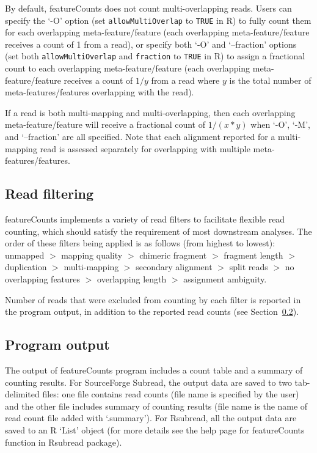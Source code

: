 \documentclass[12pt]{report}
\newcommand{\code}[1]{{\small\texttt{#1}}}
\newcommand{\Subread}{\textsf{Subread}}
\newcommand{\Rsubread}{\textsf{Rsubread}}
\newcommand{\featureCounts}{\textsf{featureCounts}}
\newcommand{\R}{\textsf{R}}
\begin{document}
By default, {\featureCounts} does not count multi-overlapping reads.
Users can specify the `-O' option (set \code{allowMultiOverlap} to \code{TRUE} in \R) to fully count them for each overlapping meta-feature/feature (each overlapping meta-feature/feature receives a count of 1 from a read), or specify both `-O' and `--fraction' options (set both \code{allowMultiOverlap} and \code{fraction} to \code{TRUE} in \R) to assign a fractional count to each overlapping meta-feature/feature (each overlapping meta-feature/feature receives a count of $1/y$ from a read where $y$ is the total number of meta-features/features overlapping with the read).

If a read is both multi-mapping and multi-overlapping, then each overlapping meta-feature/feature will receive a fractional count of $1/(x*y)$ when `-O', `-M', and `--fraction' are all specified.
Note that each alignment reported for a multi-mapping read is assessed separately for overlapping with multiple meta-features/features.


\subsection{Read filtering}
\label{sec:read_filtering}

{\featureCounts} implements a variety of read filters to facilitate flexible read counting, which should satisfy the requirement of most downstream analyses.
The order of these filters being applied is as follows (from highest to lowest):
unmapped
$>$ mapping quality
$>$ chimeric fragment
$>$ fragment length 
$>$ duplication
$>$ multi-mapping
$>$ secondary alignment
$>$ split reads
$>$ no overlapping features
$>$ overlapping length
$>$ assignment ambiguity.

Number of reads that were excluded from counting by each filter is reported in the program output, in addition to the reported read counts (see Section~\ref{sec:program_output}). 


\subsection{Program output}
\label{sec:program_output}

The output of {\featureCounts} program includes a count table and a summary of counting results.
For SourceForge {\Subread}, the output data are saved to two tab-delimited files: one file contains read counts (file name is specified by the user) and the other file includes summary of counting results (file name is the name of read count file added with `.summary').
For {\Rsubread}, all the output data are saved to an {\R} `List' object (for more details see the help page for {\featureCounts} function in {\Rsubread} package). 
\end{document}
